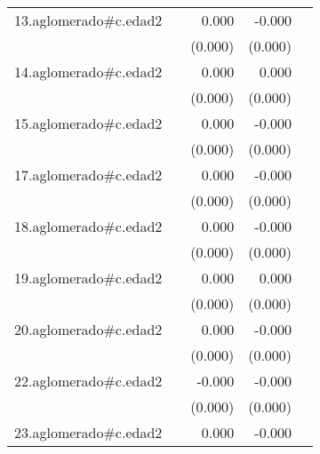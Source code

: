 {\begin{longtable}{l*{4}{D{.}{.}{-1}}}
\addlinespace
13.aglomerado#c.edad2&                     &       0.000         &      -0.000         &                     \\
            &                     &     (0.000)         &     (0.000)         &                     \\
\addlinespace
14.aglomerado#c.edad2&                     &       0.000\sym{*}  &       0.000         &                     \\
            &                     &     (0.000)         &     (0.000)         &                     \\
\addlinespace
15.aglomerado#c.edad2&                     &       0.000         &      -0.000         &                     \\
            &                     &     (0.000)         &     (0.000)         &                     \\
\addlinespace
17.aglomerado#c.edad2&                     &       0.000         &      -0.000         &                     \\
            &                     &     (0.000)         &     (0.000)         &                     \\
\addlinespace
18.aglomerado#c.edad2&                     &       0.000         &      -0.000         &                     \\
            &                     &     (0.000)         &     (0.000)         &                     \\
\addlinespace
19.aglomerado#c.edad2&                     &       0.000         &       0.000         &                     \\
            &                     &     (0.000)         &     (0.000)         &                     \\
\addlinespace
20.aglomerado#c.edad2&                     &       0.000         &      -0.000         &                     \\
            &                     &     (0.000)         &     (0.000)         &                     \\
\addlinespace
22.aglomerado#c.edad2&                     &      -0.000         &      -0.000\sym{**} &                     \\
            &                     &     (0.000)         &     (0.000)         &                     \\
\addlinespace
23.aglomerado#c.edad2&                     &       0.000         &      -0.000         &                     \\

\end{longtable}}
